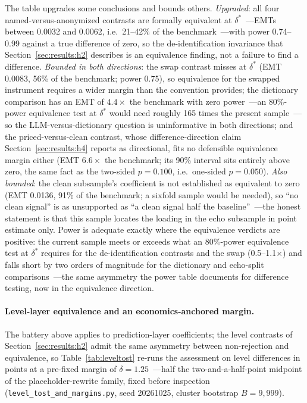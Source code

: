 The table upgrades some conclusions and bounds others. \emph{Upgraded}: all four named-versus-anonymized contrasts are formally equivalent at $\delta^{*}$~---EMTs between 0.0032 and 0.0062, i.e.\ 21--42\% of the benchmark~---with power 0.74--0.99 against a true difference of zero, so the de-identification invariance that Section~\ref{sec:results:h2} describes is an equivalence finding, not a failure to find a difference. \emph{Bounded in both directions}: the swap contrast misses at $\delta^{*}$ (EMT 0.0083, 56\% of the benchmark; power 0.75), so equivalence for the swapped instrument requires a wider margin than the convention provides; the dictionary comparison has an EMT of $4.4\times$ the benchmark with zero power~---an 80\%-power equivalence test at $\delta^{*}$ would need roughly 165 times the present sample~---so the LLM-versus-dictionary question is uninformative in both directions; and the priced-versus-clean contrast, whose difference-direction claim Section~\ref{sec:results:h4} reports as directional, fits no defensible equivalence margin either (EMT $6.6\times$ the benchmark; its 90\% interval sits entirely above zero, the same fact as the two-sided $p=0.100$, i.e.\ one-sided $p=0.050$). \emph{Also bounded}: the clean subsample's coefficient is not established as equivalent to zero (EMT 0.0136, 91\% of the benchmark; a sixfold sample would be needed), so ``no clean signal'' is as unsupported as ``a clean signal half the baseline''~---the honest statement is that this sample locates the loading in the echo subsample in point estimate only. Power is adequate exactly where the equivalence verdicts are positive: the current sample meets or exceeds what an 80\%-power equivalence test at $\delta^{*}$ requires for the de-identification contrasts and the swap (0.5--1.1$\times$) and falls short by two orders of magnitude for the dictionary and echo-split comparisons~---the same asymmetry the power table documents for difference testing, now in the equivalence direction.

\paragraph{Level-layer equivalence and an economics-anchored margin.} The battery above applies to prediction-layer coefficients; the level contrasts of Section~\ref{sec:results:h2} admit the same asymmetry between non-rejection and equivalence, so Table~\ref{tab:leveltost} re-runs the assessment on level differences in points at a pre-fixed margin of $\delta=1.25$~---half the two-and-a-half-point midpoint of the placeholder-rewrite family, fixed before inspection (\texttt{level\_tost\_and\_margins.py}, seed 20261025, cluster bootstrap $B=9{,}999$).

